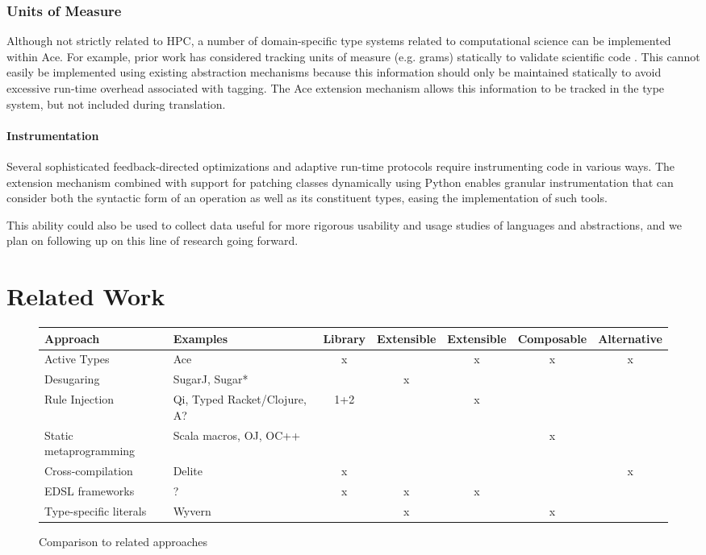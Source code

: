 \documentclass[9pt,preprint]{sigplanconf}
\begin{document}
\subsubsection{Units of Measure}
Although not strictly related to HPC, a number of domain-specific type systems related to computational science can be implemented within Ace. For example, prior work has considered tracking units of measure (e.g. grams) statically to validate scientific code \cite{conf/cefp/Kennedy09}. This cannot easily be implemented using existing abstraction mechanisms because this information should only be maintained statically to avoid excessive run-time overhead associated with tagging. The Ace extension mechanism allows this information to be tracked in the type system, but not included during translation.


\paragraph{Instrumentation}
Several sophisticated feedback-directed optimizations and adaptive run-time protocols require instrumenting code in various ways. The extension mechanism combined with support for patching classes dynamically using Python enables granular instrumentation that can consider both the syntactic form of an operation as well as its constituent types, easing the implementation of such tools.

This ability could also be used to collect data useful for more rigorous usability and usage studies of languages and abstractions, and we plan on following up on this line of research going forward.



\section{Related Work}\label{related}
\begin{figure*}
\begin{tabular}[t]{ l | l | c c c c c }
\textbf{Approach} & \textbf{Examples} & Library & {Extensible} & Extensible & Composable & Alternative \\
\hline
Active Types & Ace & x & ~ & x & x & x\\
Desugaring & SugarJ, Sugar* & ~ & x & ~ & ~ & ~\\
Rule Injection & Qi, Typed Racket/Clojure, A? & 1+2 & ~ & x & ~ & ~\\
Static metaprogramming & Scala macros, OJ, OC++ & ~ & ~ & ~ & x & ~\\
Cross-compilation & Delite & x & ~ & ~ & ~ & x\\
EDSL frameworks & ? & x & x & x & ~ & ~\\
Type-specific literals & Wyvern & ~ & x & ~ & x & ~\\
\end{tabular}
\caption{Comparison to related approaches}
\end{figure*}
\end{document}
